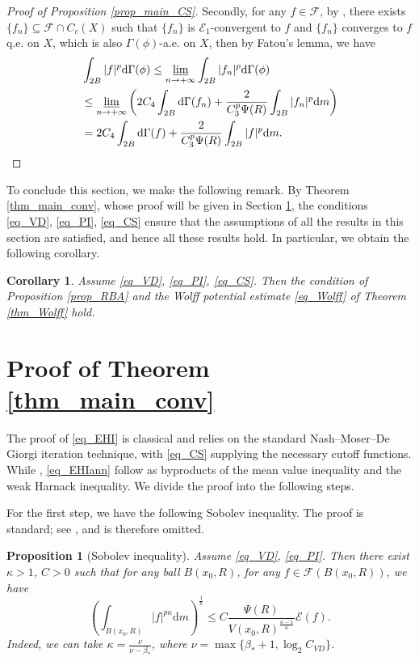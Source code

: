 \documentclass[11pt,a4paper]{article}
\numberwithin{equation}{section}
\theoremstyle{plain}
\newtheorem{proposition}[theorem]{Proposition}
\newtheorem{corollary}[theorem]{Corollary}
\theoremstyle{definition}
\begin{document}
\begin{proof}[Proof of Proposition \ref{prop_main_CS}]
Secondly, for any $f\in \mathcal{F}$, by \cite[Proposition 8.5, Proposition 8.12]{Yan25a}, there exists $\{f_n\}\subseteq \mathcal{F}\cap C_c(X)$ such that $\{f_n\}$ is $\mathcal{E}_1$-convergent to $f$ and $\{f_n\}$ converges to $f$ q.e. on $X$, which is also $\Gamma(\phi)$-a.e. on $X$, then by Fatou's lemma, we have
\begin{align*}
&\int_{2B}|f|^p\mathrm{d}\Gamma(\phi)\le\varliminf_{n\to+\infty}\int_{2B}|f_n|^p\mathrm{d}\Gamma(\phi)\\
&\le\varliminf_{n\to+\infty}\left(2C_4\int_{2B}\mathrm{d}\Gamma(f_n)+\frac{2}{C_3^{p}\Psi(R)}\int_{2B}|f_n|^p\mathrm{d} m\right)\\
&=2C_4\int_{2B}\mathrm{d}\Gamma(f)+\frac{2}{C_3^{p}\Psi(R)}\int_{2B}|f|^p\mathrm{d} m.
\end{align*}
\end{proof}

To conclude this section, we make the following remark. By Theorem \ref{thm_main_conv}, whose proof will be given in Section \ref{sec_EHI}, the conditions \ref{eq_VD}, \ref{eq_PI}, \ref{eq_CS} ensure that the assumptions of all the results in this section are satisfied, and hence all these results hold. In particular, we obtain the following corollary.

\begin{corollary}
Assume \ref{eq_VD}, \ref{eq_PI}, \ref{eq_CS}. Then the \hyperlink{eq_RBA}{} condition of Proposition \ref{prop_RBA} and the Wolff potential estimate \ref{eq_Wolff} of Theorem \ref{thm_Wolff} hold.
\end{corollary}

\section{Proof of Theorem \ref{thm_main_conv}}\label{sec_EHI}

The proof of \ref{eq_EHI} is classical and relies on the standard Nash--Moser--De Giorgi iteration technique, with \ref{eq_CS} supplying the necessary cutoff functions. While \hyperlink{eq_LSC}{}, \ref{eq_EHIann} follow as byproducts of the mean value inequality and the weak Harnack inequality. We divide the proof into the following steps.

For the first step, we have the following Sobolev inequality. The proof is standard; see \cite{BCLS95,BM95,HK95,MS95,CG98,CHS01,Sal02}, and is therefore omitted.

\begin{proposition}[Sobolev inequality]\label{prop_Sobolev}
Assume \ref{eq_VD}, \ref{eq_PI}. Then there exist $\kappa>1$, $C>0$ such that for any ball $B(x_0,R)$, for any $f\in\mathcal{F}(B(x_0,R))$, we have
$$\left(\int_{B(x_0,R)}|f|^{p\kappa}\mathrm{d} m\right)^{\frac{1}{\kappa}}\le C\frac{\Psi(R)}{V(x_0,R)^{\frac{\kappa-1}{\kappa}}}\mathcal{E}(f).$$
Indeed, we can take $\kappa=\frac{\nu}{\nu-\beta_*}$, where $\nu=\max\{\beta_*+1,\log_2C_{VD}\}$.
\end{proposition}
\end{document}
